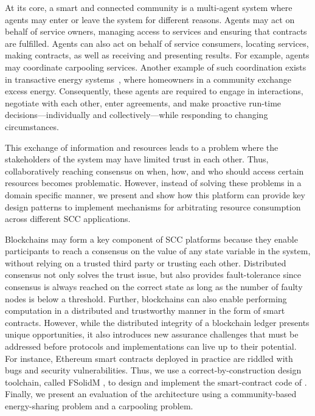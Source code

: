 At its core, a smart and connected community is a
multi-agent system where agents may enter or leave the system for different reasons. Agents may act on behalf of service owners, managing access to services and ensuring that contracts are fulfilled. Agents can also act on behalf of service consumers, locating services, making contracts, as well as receiving and presenting results.
For example, agents may coordinate carpooling services. Another example of such coordination exists in transactive energy systems~\cite{Gridwise}, where homeowners in a community exchange excess energy. Consequently, these  agents are required to engage in interactions, negotiate with each other, enter agreements, and make proactive run-time decisions---individually and collectively---while responding to changing circumstances. %

This exchange of information and resources  leads to a problem where the stakeholders of the system may have limited trust in each other. Thus, collaboratively reaching consensus on when, how, and who should access certain resources becomes problematic. However, instead of solving these problems in a domain specific manner, we present \Platform  and show how this platform can provide key design patterns to implement mechanisms for arbitrating resource consumption across different SCC applications. 

Blockchains may form a key component of SCC platforms because they enable participants to reach a consensus on the value of any state variable in the system, without relying on a trusted third party or trusting each other. Distributed consensus not only solves the trust issue, but also provides fault-tolerance since consensus is always reached on the correct state as long as the number of faulty nodes is below a threshold. Further, blockchains can also enable performing computation in a distributed and trustworthy manner in the form of smart contracts. However, while the distributed integrity of a blockchain ledger presents unique opportunities, it also introduces new assurance challenges that must be addressed before protocols and implementations can live up to their potential. For instance, Ethereum smart contracts deployed in practice are riddled with bugs and security vulnerabilities.  Thus, we use a correct-by-construction design toolchain, called FSolidM \cite{mavridou2018designing}, to design and implement  the smart-contract code of \Platform. 
\ifExtended
Finally, we present an evaluation of the architecture using a community-based energy-sharing problem and a carpooling problem.
\fi


